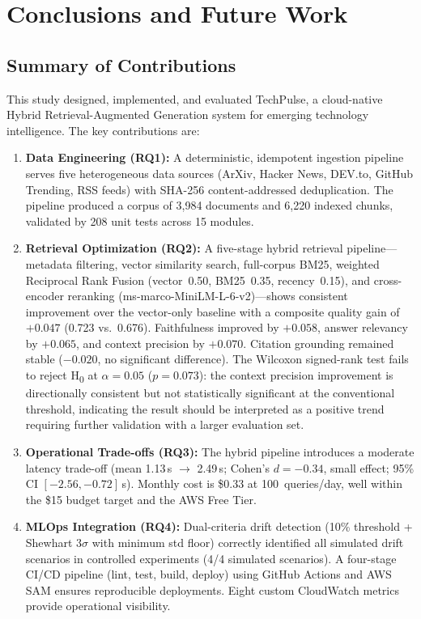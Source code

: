 \chapter{Conclusions and Future Work}

\section{Summary of Contributions}
\label{sec:conclusions}

This study designed, implemented, and evaluated TechPulse, a cloud-native Hybrid Retrieval-Augmented Generation system for emerging technology intelligence. The key contributions are:

\begin{enumerate}[leftmargin=0.5in]
  \item \textbf{Data Engineering (RQ1):} A deterministic, idempotent ingestion pipeline serves five heterogeneous data sources (ArXiv, Hacker News, DEV.to, GitHub Trending, RSS feeds) with SHA-256 content-addressed deduplication. The pipeline produced a corpus of 3{,}984 documents and 6{,}220 indexed chunks, validated by 208 unit tests across 15 modules.

  \item \textbf{Retrieval Optimization (RQ2):} A five-stage hybrid retrieval pipeline---metadata filtering, vector similarity search, full-corpus BM25, weighted Reciprocal Rank Fusion (vector~0.50, BM25~0.35, recency~0.15), and cross-encoder reranking (ms-marco-MiniLM-L-6-v2)---shows consistent improvement over the vector-only baseline with a composite quality gain of $+0.047$ (0.723 vs.\ 0.676). Faithfulness improved by $+0.058$, answer relevancy by $+0.065$, and context precision by $+0.070$. Citation grounding remained stable ($-0.020$, no significant difference). The Wilcoxon signed-rank test fails to reject H\textsubscript{0} at $\alpha = 0.05$ ($p = 0.073$): the context precision improvement is directionally consistent but not statistically significant at the conventional threshold, indicating the result should be interpreted as a positive trend requiring further validation with a larger evaluation set.

  \item \textbf{Operational Trade-offs (RQ3):} The hybrid pipeline introduces a moderate latency trade-off (mean 1.13\,s $\to$ 2.49\,s; Cohen's $d = -0.34$, small effect; 95\% CI $[-2.56, -0.72]$\,s). Monthly cost is \$0.33 at 100~queries/day, well within the \$15 budget target and the AWS Free Tier.

  \item \textbf{MLOps Integration (RQ4):} Dual-criteria drift detection (10\% threshold + Shewhart $3\sigma$ with minimum std floor) correctly identified all simulated drift scenarios in controlled experiments (4/4 simulated scenarios). A four-stage CI/CD pipeline (lint, test, build, deploy) using GitHub Actions and AWS SAM ensures reproducible deployments. Eight custom CloudWatch metrics provide operational visibility.
\end{enumerate}

